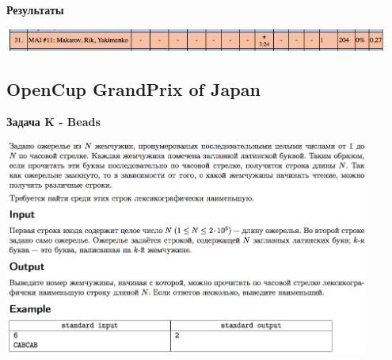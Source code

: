\documentclass[a4paper,12pt]{article}
\begin{document}
\textbf{{\large Результаты}} \\
\begin{center}
\includegraphics[width=0.95\textwidth]{OC_Peterhof/OC_Peterhof_result.png}\\ [1cm]
\end{center}



%
%
\newpage
\subsection{OpenCup GrandPrix of Japan}

\textbf{{\large Задача K - Beads}} \\
\begin{center}
\includegraphics[width=0.9\textwidth]{OC_Japan/OC_Japan_K.png}\\ [1cm]
\end{center}
\newpage
\end{document}
